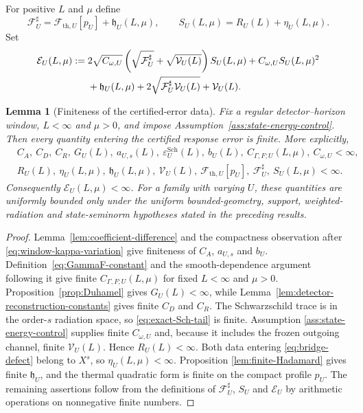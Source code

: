 \documentclass[11pt,a4paper]{article}
\newtheorem{lemma}[theorem]{Lemma}
\theoremstyle{definition}
\theoremstyle{remark}
\begin{document}
	For positive $L$ and $\mu$ define
	\begin{equation}
		\mathcal F_U^\sharp=
		\mathcal F_{\mathrm{th},U}[p_U]+\mathfrak h_U(L,\mu),
		\qquad
		S_U(L,\mu)=R_U(L)+\eta_U(L,\mu).
		\label{eq:Fsharp-S-definition}
	\end{equation}
	Set
	\begin{align}
		\mathcal E_U(L,\mu)
		:={}&2\sqrt{C_{\omega,U}}
		\left(\sqrt{\mathcal F_U^\sharp}+\sqrt{\mathcal V_U(L)}\right)S_U(L,\mu)
		+C_{\omega,U}S_U(L,\mu)^2\notag\\
		&+\mathfrak h_U(L,\mu)
		+2\sqrt{\mathcal F_U^\sharp\mathcal V_U(L)}+\mathcal V_U(L).
		\label{eq:certified-error}
	\end{align}
	
	\begin{lemma}[Finiteness of the certified-error data]
		\label{lem:certified-error-finiteness}
		Fix a regular detector--horizon window, $L<\infty$ and $\mu>0$, and impose
		Assumption~\ref{ass:state-energy-control}.  Then every quantity entering the
		certified response error is finite.  More explicitly,
		\begin{align}
			&C_A,\ C_D,\ C_R,\ G_U(L),\ a_{U,s}(L),\
			\varepsilon_U^{\mathrm{Sch}}(L),\ b_U(L),\ C_{\Gamma,F;U}(L,\mu),\
			C_{\omega,U}<\infty,
			\label{eq:finite-structural-constants}\\
			&R_U(L),\ \eta_U(L,\mu),\ \mathfrak h_U(L,\mu),\
			\mathcal V_U(L),\ \mathcal F_{\mathrm{th},U}[p_U],\
			\mathcal F_U^\sharp,\ S_U(L,\mu)<\infty.
			\label{eq:finite-error-quantities}
		\end{align}
		Consequently $\mathcal E_U(L,\mu)<\infty$.  For a family with varying $U$,
		these quantities are uniformly bounded only under the uniform bounded-geometry,
		support, weighted-radiation and state-seminorm hypotheses stated in the
		preceding results.
	\end{lemma}
	
	\begin{proof}
		Lemma~\ref{lem:coefficient-difference} and the compactness observation after
		\eqref{eq:window-kappa-variation} give finiteness of $C_A$, $a_{U,s}$ and
		$b_U$.  Definition~\eqref{eq:GammaF-constant} and the smooth-dependence
		argument following it give finite $C_{\Gamma,F;U}(L,\mu)$ for fixed
		$L<\infty$ and $\mu>0$.
		Proposition~\ref{prop:Duhamel} gives $G_U(L)<\infty$, while
		Lemma~\ref{lem:detector-reconstruction-constants} gives finite $C_D$ and
		$C_R$.  The Schwarzschild trace is in the order-$s$ radiation space, so
		\eqref{eq:exact-Sch-tail} is finite.  Assumption
		\ref{ass:state-energy-control} supplies finite $C_{\omega,U}$ and, because it
		includes the frozen outgoing channel, finite $\mathcal V_U(L)$.  Hence
		$R_U(L)<\infty$.  Both data entering \eqref{eq:bridge-defect} belong to
		$X^s$, so $\eta_U(L,\mu)<\infty$.  Proposition
		\ref{lem:finite-Hadamard} gives finite $\mathfrak h_U$, and the thermal
		quadratic form is finite on the compact profile $p_U$.  The remaining
		assertions follow from the definitions of $\mathcal F_U^\sharp$, $S_U$ and
		$\mathcal E_U$ by arithmetic operations on nonnegative finite numbers.
	\end{proof}
	
\end{document}
